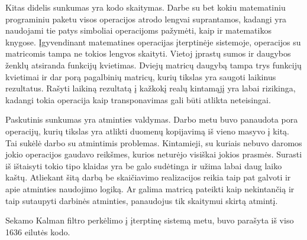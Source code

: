 Kitas didelis sunkumas yra kodo skaitymas.
Darbe su bet kokiu matematiniu programiniu paketu visos operacijos atrodo lengvai suprantamos, kadangi yra naudojami tie patys simboliai operacijoms pažymėti, kaip ir matematikos knygose.
Įgyvendinant matematines operacijas įterptinėje sistemoje, operacijos su matricomis tampa ne tokios lengvos skaityti.
Vietoj įprastų sumos ir daugybos ženklų atsiranda funkcijų kvietimas.
Dviejų matricų daugybą tampa trys funkcijų kvietimai ir dar porą pagalbinių matricų, kurių tikslas yra saugoti laikinus rezultatus.
Rašyti laikiną rezultatą į kažkokį realų kintamąjį yra labai rizikinga, kadangi tokia operacija kaip transponavimas gali būti atlikta neteisingai.

Paskutinis sunkumas yra atminties valdymas.
Darbo metu buvo panaudota pora operacijų, kurių tikslas yra atlikti duomenų kopijavimą iš vieno masyvo į kitą.
Tai sukėlė darbo su atmintimis problemas.
Kintamieji, su kuriais nebuvo daromos jokio operacijos gaudavo reikšmes, kurios neturėjo visiškai jokios prasmės.
Surasti iš ištaisyti tokio tipo klaidas yra be galo sudėtinga ir užima labai daug laiko kaštų.
Atliekant šitą darbą be skaičiavimo realizacijos reikia taip pat galvoti ir apie atminties naudojimo logiką.
Ar galima matricą pateikti kaip nekintančią ir taip sutaupyti darbinės atminties, panaudojus tik skaitymui skirtą atmintį.

Sekamo Kalman filtro perkėlimo į įterptinę sistemą metu, buvo parašyta iš viso 1636 eilutės kodo.





